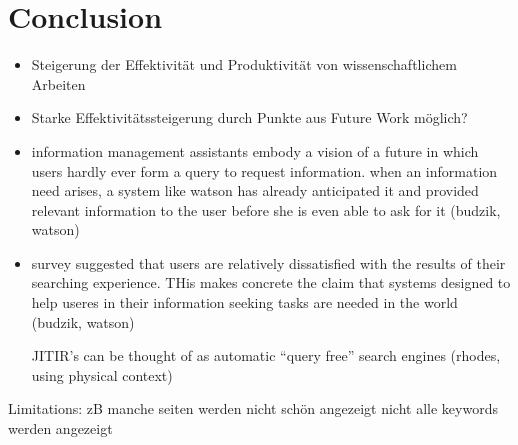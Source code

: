 \section{Conclusion}
 \begin{itemize}
 		\item Steigerung der Effektivität und Produktivität von wissenschaftlichem Arbeiten
 		\item Starke Effektivitätssteigerung durch Punkte aus Future Work möglich?
 		\item information management assistants embody a vision of a future in which users hardly ever form a query to request information. when an information need arises, a system like watson has already anticipated it and provided relevant information to the user before she is even able to ask for it (budzik, watson)
 		\item survey suggested that users are relatively dissatisfied with the results of their searching experience. THis makes concrete the claim that systems designed to help useres in their information seeking tasks are needed in the world (budzik, watson)

 		JITIR's can be thought of as automatic ``query free'' search engines (rhodes, using physical context)
 	\end{itemize}

 	Limitations: zB manche seiten werden nicht schön angezeigt
 	nicht alle keywords werden angezeigt